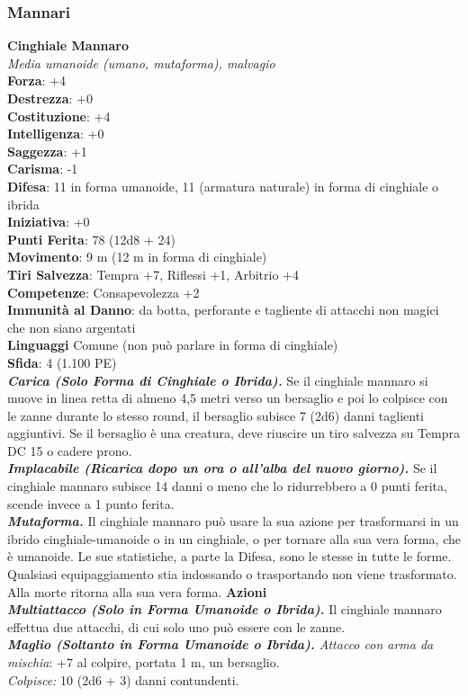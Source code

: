 \begin{multicols}{2}
\subsubsection{Mannari}

\medskip\textbf{Cinghiale Mannaro}\\
\emph{Media umanoide (umano, mutaforma), malvagio} \\
\textbf{Forza}: +4\\
\textbf{Destrezza}: +0\\
\textbf{Costituzione}: +4\\
\textbf{Intelligenza}: +0\\
\textbf{Saggezza}: +1\\
\textbf{Carisma}: -1\\
\textbf{Difesa}: 11 in forma umanoide, 11 (armatura naturale) in forma di cinghiale o ibrida\\ \textbf{Iniziativa}: +0\\
\textbf{Punti Ferita}: 78 (12d8 + 24)\\
\textbf{Movimento}: 9 m (12 m in forma di cinghiale)\\
\textbf{Tiri Salvezza}: Tempra +7, Riflessi +1, Arbitrio +4\\
\textbf{Competenze}: Consapevolezza +2\\
\textbf{Immunità al Danno}: da botta, perforante e tagliente di attacchi non magici che non siano argentati\\
\textbf{Linguaggi} Comune (non può parlare in forma di cinghiale)\\
\textbf{Sfida}: 4 (1.100 PE)\smallskip\\
\emph{\textbf{Carica (Solo Forma di Cinghiale o Ibrida).}} Se il cinghiale mannaro si muove in linea retta di almeno 4,5 metri verso un bersaglio e poi lo colpisce con le zanne durante lo stesso round, il bersaglio subisce 7 (2d6) danni taglienti aggiuntivi. Se il bersaglio è una creatura, deve riuscire un tiro salvezza su Tempra DC  15 o cadere prono.\\
\emph{\textbf{Implacabile (Ricarica dopo un ora o all'alba del nuovo giorno).}} Se il cinghiale mannaro subisce 14 danni o meno che lo ridurrebbero a 0 punti ferita, scende invece a 1 punto ferita.\\
\emph{\textbf{Mutaforma.}} Il cinghiale mannaro può usare la sua azione per trasformarsi in un ibrido cinghiale-umanoide o in un cinghiale, o per tornare alla sua vera forma, che è umanoide. Le sue statistiche, a parte la Difesa, sono le stesse in tutte le forme. Qualsiasi equipaggiamento stia indossando o trasportando non viene trasformato. Alla morte ritorna alla sua vera forma.
\smallskip\textbf{Azioni}\\
\emph{\textbf{Multiattacco (Solo in Forma Umanoide o Ibrida).}} Il cinghiale mannaro effettua due attacchi, di cui solo uno può essere con le zanne.\\
\emph{\textbf{Maglio (Soltanto in Forma Umanoide o Ibrida).} Attacco con arma da mischia}: +7 al colpire, portata 1 m, un bersaglio. \\
\emph{Colpisce:} 10 (2d6 + 3) danni contundenti.\\


\end{multicols}

